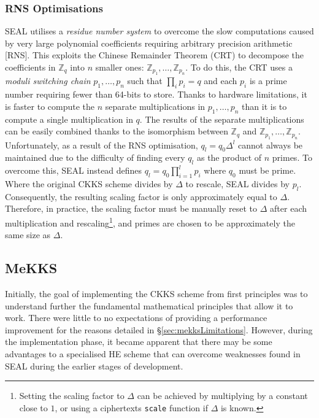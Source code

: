 \setlength{\leftskip}{0cm}
\subsubsection{RNS Optimisations}
\setlength{\leftskip}{0.5cm}
\indent \indent
SEAL utilises a \textit{residue number system} \cite{RNS} to overcome the slow computations caused by very large polynomial coefficients requiring arbitrary precision arithmetic [RNS]. This exploits the Chinese Remainder Theorem (CRT) to decompose the coefficients in $\mathbb{Z}_q$ into $n$ smaller ones: $\mathbb{Z}_{p_1}, \ldots, \mathbb{Z}_{p_n}$. To do this, the CRT uses a \textit{moduli switching chain} $p_1, \ldots, p_n$ such that $\prod_i p_i = q$ and each $p_i$ is a prime number requiring fewer than 64-bits to store. Thanks to hardware limitations, it is faster to compute the $n$ separate multiplications in $p_1, \ldots, p_n$ than it is to compute a single multiplication in $q$. The results of the separate multiplications can be easily combined thanks to the isomorphism between $\mathbb{Z}_q$ and $\mathbb{Z}_{p_1}, \ldots, \mathbb{Z}_{p_n}$.
\smallskip \\ \indent
Unfortunately, as a result of the RNS optimisation, $q_l = q_0 \Delta^l$ cannot always be maintained due to the difficulty of finding every $q_l$ as the product of $n$ primes. To overcome this, SEAL instead defines $q_l = q_0 \prod_{i=1}^l p_i$ where $q_0$ must be prime. Where the original CKKS scheme divides by $\Delta$ to rescale, SEAL divides by $p_l$. Consequently, the resulting scaling factor is only approximately equal to $\Delta$. Therefore, in practice, the scaling factor must be manually reset to $\Delta$ after each multiplication and rescaling\footnote{Setting the scaling factor to $\Delta$ can be achieved by multiplying by a constant close to $1$, or using a ciphertexts \texttt{scale} function if $\Delta$ is known.}, and primes are chosen to be approximately the same size as $\Delta$.

\setlength{\leftskip}{0cm}

\subsection{MeKKS}
\label{sec:mekks}
\setlength{\leftskip}{0.5cm}
\indent \indent
Initially, the goal of implementing the CKKS scheme from first principles was to understand further the fundamental mathematical principles that allow it to work. There were little to no expectations of providing a performance improvement for the reasons detailed in §\ref{sec:mekksLimitations}. However, during the implementation phase, it became apparent that there may be some advantages to a specialised HE scheme that can overcome weaknesses found in SEAL during the earlier stages of development.

